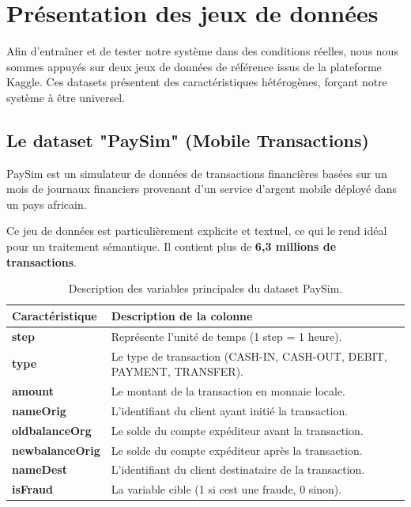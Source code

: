 \documentclass[12pt, a4paper, twoside]{report}
\begin{document}
\section{Présentation des jeux de données}

Afin d'entraîner et de tester notre système dans des conditions réelles, nous nous sommes appuyés sur deux jeux de données de référence issus de la plateforme Kaggle. Ces datasets présentent des caractéristiques hétérogènes, forçant notre système à être universel.

\subsection{Le dataset "PaySim" (Mobile Transactions)}
PaySim est un simulateur de données de transactions financières basées sur un mois de journaux financiers provenant d'un service d'argent mobile déployé dans un pays africain. 

Ce jeu de données est particulièrement explicite et textuel, ce qui le rend idéal pour un traitement sémantique. Il contient plus de \textbf{6,3 millions de transactions}. 

\begin{table}[htbp]
    \centering
    \begin{tabularx}{\textwidth}{>{\bfseries}l X}
        \toprule
        Caractéristique & Description de la colonne \\
        \midrule
        step & Représente l'unité de temps (1 step = 1 heure). \\
        type & Le type de transaction (CASH-IN, CASH-OUT, DEBIT, PAYMENT, TRANSFER). \\
        amount & Le montant de la transaction en monnaie locale. \\
        nameOrig & L'identifiant du client ayant initié la transaction. \\
        oldbalanceOrg & Le solde du compte expéditeur avant la transaction. \\
        newbalanceOrig & Le solde du compte expéditeur après la transaction. \\
        nameDest & L'identifiant du client destinataire de la transaction. \\
        isFraud & La variable cible (1 si cest une fraude, 0 sinon). \\
        \bottomrule
    \end{tabularx}
    \caption{Description des variables principales du dataset PaySim.}
    \label{tab:paysim_desc}
\end{table}
\end{document}
